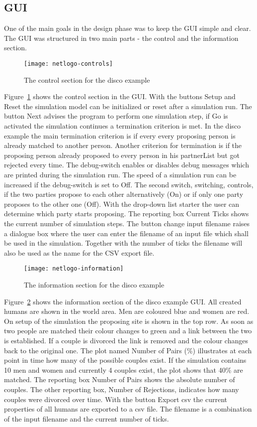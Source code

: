 \subsection{GUI}
One of the main goals in the design phase was to keep the GUI simple and clear.
The GUI was structured in two main parts - the control and the information section.
\begin{figure}[H]
  \caption{The control section for the disco example}
	\label{fig:control-disco-gui}
  \centering
    \texttt{[image: netlogo-controls]}
\end{figure}
Figure~\ref{fig:control-disco-gui} shows the control section in the GUI. 
With the buttons Setup and Reset the simulation model can be initialized or reset after a simulation run.
The button Next advises the program to perform one simulation step, if Go is activated the simulation continues a termination criterion is met.
In the disco example the main termination criterion is if every every proposing person is already matched to another person. 
Another criterion for termination is if the proposing person already proposed to every person in his partnerList but got rejected every time.
The debug-switch enables or disables debug messages which are printed during the simulation run.
The speed of a simulation run can be increased if the debug-switch is set to Off.
The second switch, switching, controls, if the two parties propose to each other alternatively (On) or if only one party proposes to the other one (Off).
With the drop-down list starter the user can determine which party starts proposing.
The reporting box Current Ticks shows the current number of simulation steps.
The button change input filename raises a dialogue box where the user can enter the filename of an input file which shall be used in the simulation.
Together with the number of ticks the filename will also be used as the name for the CSV export file.
\begin{figure}[H]
  \caption{The information section for the disco example}
	\label{fig:info-disco-gui}
  \centering
    \texttt{[image: netlogo-information]}
\end{figure}
Figure~\ref{fig:info-disco-gui} shows the information section of the disco example GUI. 
All created humans are shown in the world area. 
Men are coloured blue and women are red.
On setup of the simulation the proposing site is shown in the top row. 
As soon as two people are matched their colour changes to green and a link between the two is established.
If a couple is divorced the link is removed and the colour changes back to the original one.
The plot named Number of Pairs (\%) illustrates at each point in time how many of the possible couples exist. 
If the simulation contains 10 men and women and currently 4 couples exist, the plot shows that 40\% are matched.
The reporting box Number of Pairs shows the absolute number of couples.
The other reporting box, Number of Rejections, indicates how many couples were divorced over time.
With the button Export csv the current properties of all humans are exported to a csv file.
The filename is a combination of the input filename and the current number of ticks.

